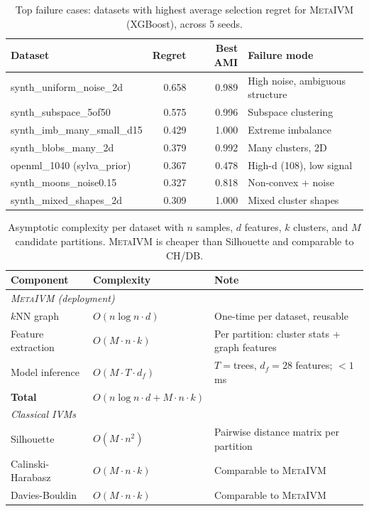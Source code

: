 \documentclass[10pt]{article} %
\newcommand{\ours}{\textsc{MetaIVM}}
\begin{document}
\begin{table}[h]
\centering
\caption{Top failure cases: datasets with highest average selection regret for \ours{} (XGBoost), across 5 seeds.}
\label{tab:failure}
\small
\begin{tabular}{lrrl}
\toprule
\textbf{Dataset} & \textbf{Regret} & \textbf{Best AMI} & \textbf{Failure mode} \\
\midrule
synth\_uniform\_noise\_2d & 0.658 & 0.989 & High noise, ambiguous structure \\
synth\_subspace\_5of50 & 0.575 & 0.996 & Subspace clustering \\
synth\_imb\_many\_small\_d15 & 0.429 & 1.000 & Extreme imbalance \\
synth\_blobs\_many\_2d & 0.379 & 0.992 & Many clusters, 2D \\
openml\_1040 (sylva\_prior) & 0.367 & 0.478 & High-d (108), low signal \\
synth\_moons\_noise0.15 & 0.327 & 0.818 & Non-convex + noise \\
synth\_mixed\_shapes\_2d & 0.309 & 1.000 & Mixed cluster shapes \\
\bottomrule
\end{tabular}
\end{table}

\begin{table}[h]
\centering
\caption{Asymptotic complexity per dataset with $n$ samples, $d$ features, $k$ clusters, and $M$ candidate partitions. \ours{} is cheaper than Silhouette and comparable to CH/DB.}
\label{tab:complexity}
\small
\begin{tabular}{lll}
\toprule
\textbf{Component} & \textbf{Complexity} & \textbf{Note} \\
\midrule
\multicolumn{3}{l}{\textit{\ours{} (deployment)}} \\
$k$NN graph & $O(n \log n \cdot d)$ & One-time per dataset, reusable \\
Feature extraction & $O(M \cdot n \cdot k)$ & Per partition: cluster stats + graph features \\
Model inference & $O(M \cdot T \cdot d_f)$ & $T{=}$trees, $d_f{=}28$ features; $< 1$\,ms \\
\textbf{Total} & $O(n \log n \cdot d + M \cdot n \cdot k)$ & \\
\midrule
\multicolumn{3}{l}{\textit{Classical IVMs}} \\
Silhouette & $O(M \cdot n^2)$ & Pairwise distance matrix per partition \\
Calinski-Harabasz & $O(M \cdot n \cdot k)$ & Comparable to \ours{} \\
Davies-Bouldin & $O(M \cdot n \cdot k)$ & Comparable to \ours{} \\
\bottomrule
\end{tabular}
\end{table}
\end{document}
